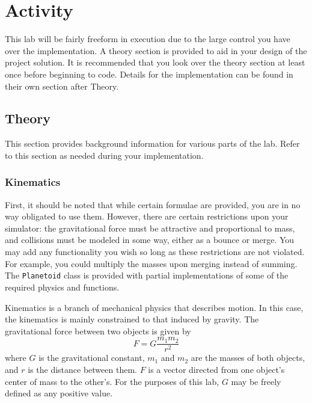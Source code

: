 \section{Activity}
This lab will be fairly freeform in execution due to the large control you have over the implementation.
A theory section is provided to aid in your design of the project solution.
It is recommended that you look over the theory section at least once before beginning to code.
Details for the implementation can be found in their own section after Theory.

\subsection{Theory}
This section provides background information for various parts of the lab.
Refer to this section as needed during your implementation.

\subsubsection{Kinematics}
First, it should be noted that while certain formulae are provided, you are in no way obligated to use them. 
However, there are certain restrictions upon your simulator: the gravitational force must be attractive and proportional to mass, and collisions must be modeled in some way, either as a bounce or merge.
You may add any functionality you wish so long as these restrictions are not violated.
For example, you could multiply the masses upon merging instead of summing.
The \verb=Planetoid= class is provided with partial implementations of some of the required physics and functions.

Kinematics is a branch of mechanical physics that describes motion.
In this case, the kinematics is mainly constrained to that induced by gravity.
The gravitational force between two objects is given by $$F = G{\frac{m_1m_2}{r^2}}$$ where $G$ is the gravitational constant, $m_1$ and $m_2$ are the masses of both objects, and $r$ is the distance between them.
$F$ is a vector directed from one object's center of mass to the other's.
For the purposes of this lab, $G$ may be freely defined as any positive value.

